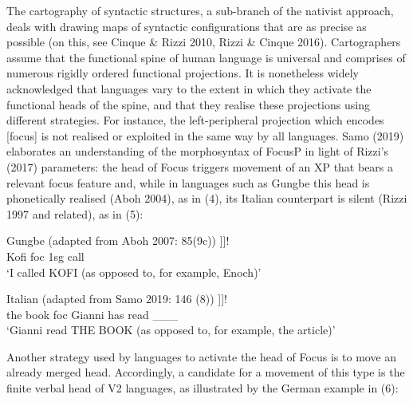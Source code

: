 \documentclass[fleqn,10pt]{wlscirep}
\begin{document}
The cartography of syntactic structures, a sub-branch of the nativist approach, deals with
 drawing maps of syntactic configurations that are as precise as possible (on this, see Cinque \& Rizzi 2010, Rizzi \& Cinque 2016). Cartographers assume that the functional spine of human language is universal and comprises of numerous rigidly ordered functional projections. It is nonetheless widely acknowledged that languages vary to the extent in which they activate the functional heads of the spine, and that they realise these projections using different strategies. 
For instance, the left-peripheral projection which encodes [focus] is not realised or exploited in the same way by all languages. Samo (2019) elaborates an understanding of the morphosyntax of FocusP in light of Rizzi’s (2017) parameters: the head of Focus triggers movement of an XP that bears a relevant focus feature and, while in languages such as Gungbe this head is phonetically realised (Aboh 2004), as in (4), its Italian counterpart is silent (Rizzi 1997 and related), as in (5):

\begin{exe}
    \ex Gungbe (adapted from Aboh 2007: 85(9c))
        \gll [\textsubscript{FocusP}  	KÒFÍ\textsubscript{i}   [\textsubscript{Focus^0} 	wè 			[	ùn   		yró		\_\_\_\textsubscript{i}		]]]!\\
        {} Kofi        {} 			foc    {}    	1sg   	call {} {}\\
        \vspace{-3mm}
        \glt ‘I called KOFI (as opposed to, for example, Enoch)’
\end{exe}

\begin{exe}
    \ex Italian (adapted from Samo 2019: 146 (8))
        \gll [\textsubscript{FocusP} 	IL LIBRO\textsubscript{i}	    [\textsubscript{Focus^0} 	$\emptyset$ 		[	Gianni 		ha 		letto 	\_\_\_\textsubscript{i}	]]]!\\
        {} the book				{}		foc		{}	Gianni 		has 	read 	\_\_\_\\
        \vspace{-3mm}
        \glt ‘Gianni read THE BOOK (as opposed to, for example, the article)’	
\end{exe}

Another strategy used by languages to activate the head of Focus is to move an already merged head. Accordingly, a candidate for a movement of this type is the finite verbal head of V2 languages, as illustrated by the German example in (6):
\end{document}
